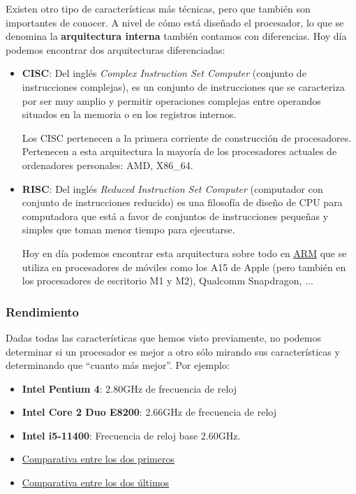 Existen otro tipo de características más técnicas, pero que también son importantes de conocer. A nivel de cómo está diseñado el procesador, lo que se denomina la \textbf{arquitectura interna} también contamos con diferencias. Hoy día podemos encontrar dos arquitecturas diferenciadas:
\begin{itemize}
    \item \textbf{CISC}: Del inglés \textit{Complex Instruction Set Computer} (conjunto de instrucciones complejas), es un conjunto de instrucciones  que se caracteriza por ser muy amplio y permitir operaciones complejas entre operandos situados en la memoria o en los registros internos.

    Los CISC pertenecen a la primera corriente de construcción de procesadores. Pertenecen a esta arquitectura la mayoría de los procesadores actuales de ordenadores personales: AMD, X86\_64.

    \item \textbf{RISC}: Del inglés \textit{Reduced Instruction Set Computer} (computador con conjunto de instrucciones reducido) es una filosofía de diseño de CPU para computadora que está a favor de conjuntos de instrucciones pequeñas y simples que toman menor tiempo para ejecutarse.

    Hoy en día podemos encontrar esta arquitectura sobre todo en \href{https://es.wikipedia.org/wiki/Arquitectura_ARM}{ARM} que se utiliza en procesadores de móviles como los A15 de Apple (pero también en los procesadores de escritorio M1 y M2), Qualcomm Snapdragon, ...

\end{itemize}



\subsubsection{Rendimiento}
Dadas todas las características que hemos visto previamente, no podemos determinar si un procesador es mejor a otro sólo mirando sus características y determinando que “cuanto más mejor”. Por ejemplo:

\begin{itemize}
    \item \textbf{Intel Pentium 4}: 2.80GHz de frecuencia de reloj
    \item \textbf{Intel Core 2 Duo E8200}: 2.66GHz de frecuencia de reloj
    \item \textbf{Intel i5-11400}: Frecuencia de reloj base 2.60GHz.
    \item \href{https://cpu.userbenchmark.com/Compare/Intel-Pentium-4-280GHz-vs-Intel-Core2-Duo-E8200/m3163vsm3200}{Comparativa entre los dos primeros}
    \item \href{https://cpu.userbenchmark.com/Compare/Intel-Core-i5-11400-vs-Intel-Core2-Duo-E8200/4112vsm3200}{Comparativa entre los dos últimos}
\end{itemize}

